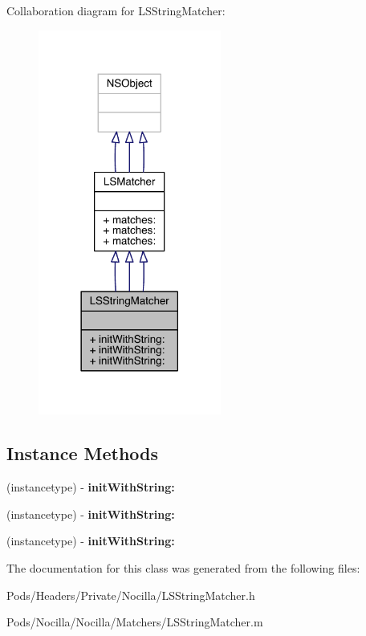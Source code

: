 Collaboration diagram for L\-S\-String\-Matcher\-:\nopagebreak
\begin{figure}[H]
\begin{center}
\leavevmode
\includegraphics[width=170pt]{interface_l_s_string_matcher__coll__graph}
\end{center}
\end{figure}
\subsection*{Instance Methods}
\begin{DoxyCompactItemize}
\item 
\hypertarget{interface_l_s_string_matcher_a82bd9aa95ebc1f69f6df1cedf6e0ade6}{(instancetype) -\/ {\bfseries init\-With\-String\-:}}\label{interface_l_s_string_matcher_a82bd9aa95ebc1f69f6df1cedf6e0ade6}

\item 
\hypertarget{interface_l_s_string_matcher_a82bd9aa95ebc1f69f6df1cedf6e0ade6}{(instancetype) -\/ {\bfseries init\-With\-String\-:}}\label{interface_l_s_string_matcher_a82bd9aa95ebc1f69f6df1cedf6e0ade6}

\item 
\hypertarget{interface_l_s_string_matcher_a82bd9aa95ebc1f69f6df1cedf6e0ade6}{(instancetype) -\/ {\bfseries init\-With\-String\-:}}\label{interface_l_s_string_matcher_a82bd9aa95ebc1f69f6df1cedf6e0ade6}

\end{DoxyCompactItemize}


The documentation for this class was generated from the following files\-:\begin{DoxyCompactItemize}
\item 
Pods/\-Headers/\-Private/\-Nocilla/L\-S\-String\-Matcher.\-h\item 
Pods/\-Nocilla/\-Nocilla/\-Matchers/L\-S\-String\-Matcher.\-m\end{DoxyCompactItemize}
